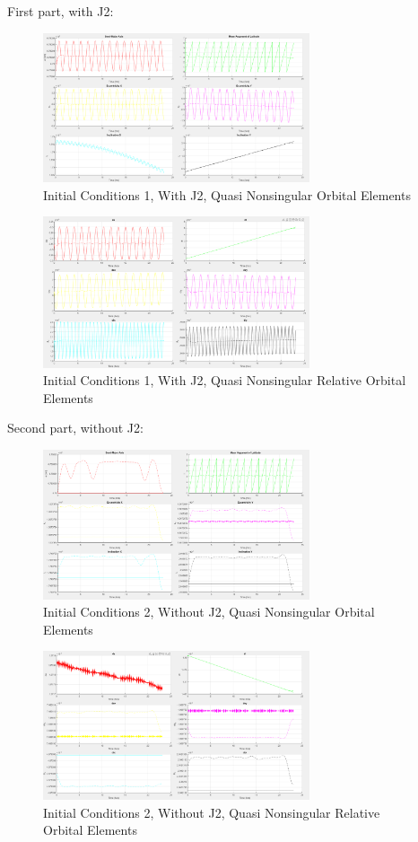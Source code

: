First part, with J2:
\begin{figure}[H]
    \centering
    \includegraphics[width=0.7\textwidth]{PS4/Figures/case1_J2.png}
    \caption{Initial Conditions 1, With J2, Quasi Nonsingular Orbital Elements}
    \label{fig:hcw_velocity}
\end{figure}
\begin{figure}[H]
    \centering
    \includegraphics[width=0.7\textwidth]{PS4/Figures/case1_J2_2.png}
    \caption{Initial Conditions 1, With J2, Quasi Nonsingular Relative Orbital Elements}
    \label{fig:hcw_velocity}
\end{figure}
Second part, without J2:
\begin{figure}[H]
    \centering
    \includegraphics[width=0.7\textwidth]{PS4/Figures/case2_noJ2.png}
    \caption{Initial Conditions 2, Without J2, Quasi Nonsingular Orbital Elements}
    \label{fig:hcw_velocity}
\end{figure}
\begin{figure}[H]
    \centering
    \includegraphics[width=0.7\textwidth]{PS4/Figures/case2_noJ2_2.png}
    \caption{Initial Conditions 2, Without J2, Quasi Nonsingular Relative Orbital Elements}
    \label{fig:hcw_velocity}
\end{figure}
